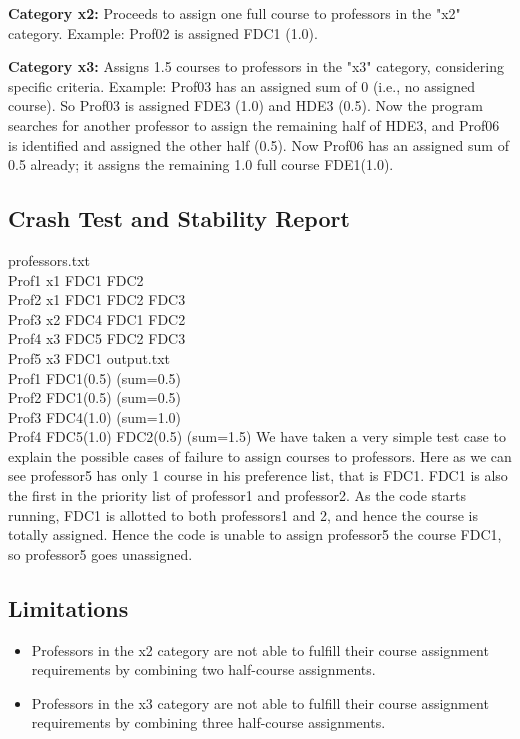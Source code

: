 \documentclass{article}
\begin{document}
\textbf{Category x2:} Proceeds to assign one full course to professors in the "x2" category. Example: Prof02 is assigned FDC1 (1.0).

\textbf{Category x3:} Assigns 1.5 courses to professors in the "x3" category, considering specific criteria. Example: Prof03 has an assigned sum of 0 (i.e., no assigned course). So Prof03 is assigned FDE3 (1.0) and HDE3 (0.5). Now the program searches for another professor to assign the remaining half of HDE3, and Prof06 is identified and assigned the other half (0.5). Now Prof06 has an assigned sum of 0.5 already; it assigns the remaining 1.0 full course FDE1(1.0).

\subsection*{Crash Test and Stability Report}

professors.txt
\\Prof1 x1 FDC1 FDC2
\\Prof2 x1 FDC1 FDC2 FDC3
\\Prof3 x2 FDC4 FDC1 FDC2
\\Prof4 x3 FDC5 FDC2 FDC3
\\Prof5 x3 FDC1
\break
\break
output.txt
\\Prof1 FDC1(0.5)   (sum=0.5)
\\Prof2 FDC1(0.5)   (sum=0.5)
\\Prof3 FDC4(1.0)   (sum=1.0)
\\Prof4 FDC5(1.0) FDC2(0.5)   (sum=1.5)
\break
\break
We have taken a very simple test case to explain the possible cases of failure to assign courses to professors. Here as we can see professor5 has only 1 course in his preference list, that is FDC1. FDC1 is also the first in the priority list of professor1 and professor2. As the code starts running, FDC1 is allotted to both professors1 and 2, and hence the course is totally assigned. Hence the code is unable to assign professor5 the course FDC1, so professor5 goes unassigned.



\subsection*{Limitations}
\begin{itemize}
  \item Professors in the x2 category are not able to fulfill their course assignment requirements by combining two half-course assignments.
  \item Professors in the x3 category are not able to fulfill their course assignment requirements by combining three half-course assignments.
\end{itemize}
\end{document}
